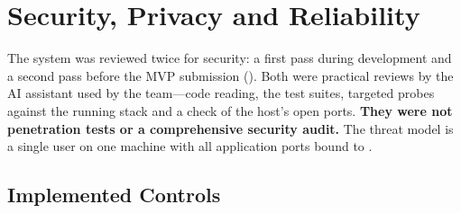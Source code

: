 \chapter{Security, Privacy and Reliability}\label{ch:security}

The system was reviewed twice for security: a first pass during development and a second pass before the MVP
submission (). Both were practical reviews by the AI assistant used by the
team---code reading, the test suites, targeted probes against the running stack and a check of the host's open
ports. \textbf{They were not penetration tests or a comprehensive security audit.} The threat model is a single user
on one machine with all application ports bound to .

\section{Implemented Controls}

